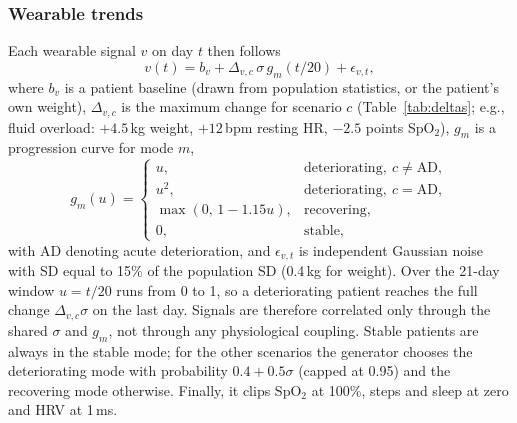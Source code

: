 \documentclass[conference]{IEEEtran}
\begin{document}
\subsubsection{Wearable trends}
Each wearable signal $v$ on day $t$ then follows
\begin{equation}
v(t)=b_v+\Delta_{v,c}\,\sigma\,g_m(t/20)+\epsilon_{v,t},
\label{eq:wearable}
\end{equation}
where $b_v$ is a patient baseline (drawn from population statistics, or the patient's own weight), $\Delta_{v,c}$ is the maximum change for scenario $c$ (Table~\ref{tab:deltas}; e.g., fluid overload: $+4.5$\,kg weight, $+12$\,bpm resting HR, $-2.5$ points SpO$_2$), $g_m$ is a progression curve for mode $m$,
\begin{equation}
g_m(u)=\begin{cases}u, & \text{deteriorating},\ c\neq\text{AD},\\ u^2, & \text{deteriorating},\ c=\text{AD},\\ \max(0,\,1-1.15u), & \text{recovering},\\ 0, & \text{stable},\end{cases}
\label{eq:progression}
\end{equation}
with AD denoting acute deterioration, and $\epsilon_{v,t}$ is independent Gaussian noise with SD equal to 15\% of the population SD (0.4\,kg for weight). Over the 21-day window $u=t/20$ runs from 0 to 1, so a deteriorating patient reaches the full change $\Delta_{v,c}\sigma$ on the last day. Signals are therefore correlated only through the shared $\sigma$ and $g_m$, not through any physiological coupling. Stable patients are always in the stable mode; for the other scenarios the generator chooses the deteriorating mode with probability $0.4+0.5\sigma$ (capped at 0.95) and the recovering mode otherwise. Finally, it clips SpO$_2$ at 100\%, steps and sleep at zero and HRV at 1\,ms.
\end{document}
